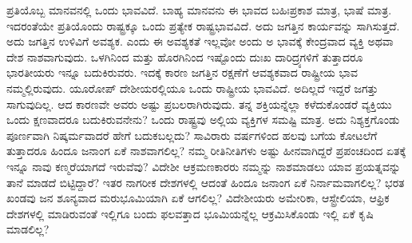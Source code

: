 ಪ್ರತಿಯೊಬ್ಬ ಮಾನವನಲ್ಲಿ ಒಂದು ಭಾವವಿದೆ. ಬಾಹ್ಯ ಮಾನವನು ಈ ಭಾವದ ಬಹಿಃಪ್ರಕಾಶ ಮಾತ್ರ, ಭಾಷೆ ಮಾತ್ರ. ಇದರಂತೆಯೇ ಪ್ರತಿಯೊಂದು ರಾಷ್ಟ್ರಕ್ಕೂ ಒಂದು ಪ್ರತ್ಯೇಕ ರಾಷ್ಟ್ರಭಾವವಿದೆ. ಅದು ಜಗತ್ತಿನ ಕಾರ್ಯವನ್ನು ಸಾಗಿಸುತ್ತದೆ. ಅದು ಜಗತ್ತಿನ ಉಳಿವಿಗೆ ಅವಶ್ಯಕ. ಎಂದು ಈ ಅವಶ್ಯಕತೆ ಇಲ್ಲವೋ ಅಂದು ಅ ಭಾವಕ್ಕೆ ಕೇಂದ್ರವಾದ ವ್ಯಕ್ತಿ ಅಥವಾ ದೇಶ ನಾಶವಾಗುವುದು. ಒಳಗಿನಿಂದ ಮತ್ತು ಹೊರಗಿನಿಂದ ಇಷ್ಟೊಂದು ದುಃಖ ದಾರಿದ್ರ್ಯಗಳಿಗೆ ತುತ್ತಾದರೂ ಭಾರತೀಯರು ಇನ್ನೂ ಬದುಕಿರುವರು. ಇದಕ್ಕೆ ಕಾರಣ ಜಗತ್ತಿನ ರಕ್ಷಣೆಗೆ ಆವಶ್ಯಕವಾದ ರಾಷ್ಟ್ರೀಯ ಭಾವ ನಮ್ಮಲ್ಲಿರುವುದು. ಯೂರೋಪ್​ ದೇಶೀಯರಲ್ಲಿಯೂ ಒಂದು ರಾಷ್ಟ್ರೀಯ ಭಾವವಿದೆ. ಅದಿಲ್ಲದೆ ಇದ್ದರೆ ಜಗತ್ತು ಸಾಗುವುದಿಲ್ಲ. ಆದ ಕಾರಣವೇ ಅವರು ಅಷ್ಟು ಪ್ರಬಲರಾಗಿರುವುದು. ತನ್ನ ಶಕ್ತಿಯನ್ನೆಲ್ಲಾ ಕಳೆದುಕೊಂಡರೆ ವ್ಯಕ್ತಿಯು ಒಂದು ಕ್ಷಣವಾದರೂ ಬದುಕಿರುವನೇನು? ಒಂದು ರಾಷ್ಟ್ರವು ಅಲ್ಲಿಯ ವ್ಯಕ್ತಿಗಳ ಸಮಷ್ಟಿ ಮಾತ್ರ. ಅದು ನಿಶ್ಯಕ್ತಗೊಂಡು ಪೂರ್ಣವಾಗಿ ನಿಷ್ಕರ್ಮವಾದರೆ ಹೇಗೆ ಬದುಕಬಲ್ಲದು? ಸಾವಿರಾರು ವರ್ಷಗಳಿಂದ ಹಲವು ಬಗೆಯ ಕೋಟಲೆಗೆ ತುತ್ತಾದರೂ ಹಿಂದೂ ಜನಾಂಗ ಏಕೆ ನಾಶವಾಗಲಿಲ್ಲ? ನಮ್ಮ ರೀತಿನೀತಿಗಳು ಅಷ್ಟು ಹೀನವಾಗಿದ್ದರೆ ಪ್ರಪಂಚದಿಂದ ಏತಕ್ಕೆ ಇನ್ನೂ ನಾವು ಕಣ್ಮರೆಯಾಗದೆ ಇರುವೆವು? ವಿದೇಶೀ ಆಕ್ರಮಣಕಾರರು ನಮ್ಮನ್ನು ನಾಶಮಾಡಲು ಯಾವ ಪ್ರಯತ್ನವನ್ನು ತಾನೆ ಮಾಡದೆ ಬಿಟ್ಟಿದ್ದಾರೆ? ಇತರ ನಾಗರೀಕ ದೇಶಗಳಲ್ಲಿ ಆದಂತೆ ಹಿಂದೂ ಜನಾಂಗ ಏಕೆ ನಿರ್ನಾಮವಾಗಲಿಲ್ಲ? ಭರತ ಖಂಡವು ಜನ ಶೂನ್ಯವಾದ ಮರುಭೂಮಿಯಾಗಿ ಏಕೆ ಆಗಲಿಲ್ಲ? ವಿದೇಶೀಯರು ಅಮೇರಿಕಾ, ಆಸ್ಟ್ರೇಲಿಯಾ, ಆಫ್ರಿಕ ದೇಶಗಳಲ್ಲಿ ಮಾಡಿರುವಂತೆ ಇಲ್ಲಿಗೂ ಬಂದು ಫಲವತ್ತಾದ ಭೂಮಿಯನ್ನೆಲ್ಲ ಆಕ್ರಮಿಸಿಕೊಂಡು ಇಲ್ಲಿ ಏಕೆ ಕೃಷಿ ಮಾಡಲಿಲ್ಲ?

\vskip 4pt

